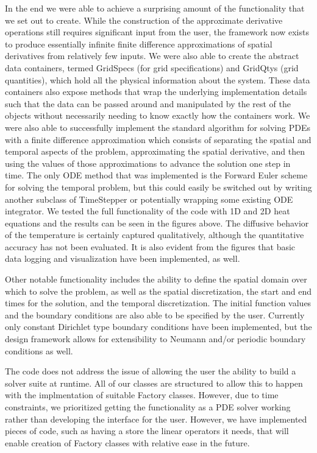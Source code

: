 \documentclass{article}
\begin{document}
	In the end we were able to achieve a surprising amount of the functionality that we set out to create. While the construction of the approximate derivative operations still requires significant input from the user, the framework now exists to produce essentially infinite finite difference approximations of spatial derivatives from relatively few inputs. We were also able to create the abstract data containers, termed GridSpecs (for grid specifications) and GridQtys (grid quantities), which hold all the physical information about the system. These data containers also expose methods that wrap the underlying implementation details such that the data can be passed around and manipulated by the rest of the objects without necessarily needing to know exactly how the containers work. We were also able to successfully implement the standard algorithm for solving PDEs with a finite difference approximation which consists of separating the spatial and temporal aspects of the problem, approximating the spatial derivative, and then using the values of those approximations to advance the solution one step in time. The only ODE method that was implemented is the Forward Euler scheme for solving the temporal problem, but this could easily be switched out by writing another subclass of TimeStepper or potentially wrapping some existing ODE integrator. We tested the full functionality of the code with 1D and 2D heat equations and the results can be seen in the figures above. The diffusive behavior of the temperature is certainly captured qualitatively, although the quantitative accuracy has not been evaluated. It is also evident from the figures that basic data logging and visualization have been implemented, as well.
	
	Other notable functionality includes the ability to define the spatial domain over which to solve the problem, as well as the spatial discretization, the start and end times for the solution, and the temporal discretization. The initial function values and the boundary conditions are also able to be specified by the user. Currently only constant Dirichlet type boundary conditions have been implemented, but the design framework allows for extensibility to Neumann and/or periodic boundary conditions as well.

	The code does not address the issue of allowing the user the ability to build a solver suite at runtime. All of our classes are structured to allow this to happen with the implmentation of suitable Factory classes. However, due to time constraints, we prioritized getting the functionality as a PDE solver working rather than developing the interface for the user. However, we have implemented pieces of code, such as having a  store the linear operators it needs, that will enable creation of Factory classes with relative ease in the future.
\end{document}
